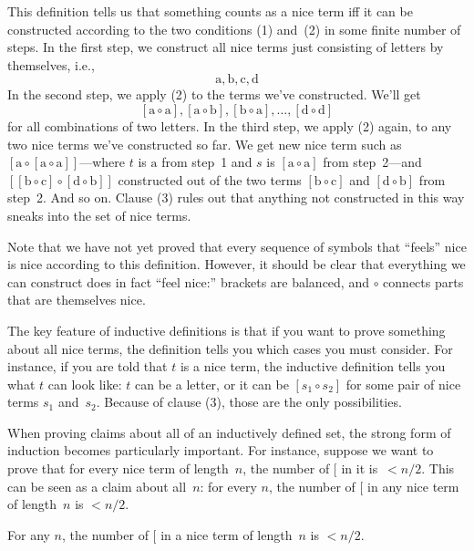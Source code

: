 \documentclass[../../../include/open-logic-section]{subfiles}
\begin{document}
This definition tells us that something counts as a nice term iff it
can be constructed according to the two conditions (1) and~(2) in some
finite number of steps. In the first step, we construct all nice terms
just consisting of letters by themselves, i.e.,
\[
\mathrm{a}, \mathrm{b}, \mathrm{c}, \mathrm{d}
\]
In the second step, we apply (2) to the terms we've constructed. We'll get
\[
[\mathrm{a} \circ \mathrm{a}], [\mathrm{a} \circ \mathrm{b}],
[\mathrm{b} \circ \mathrm{a}], \dots, [\mathrm{d} \circ \mathrm{d}]
\]
for all combinations of two letters. In the third step, we apply (2)
again, to any two nice terms we've constructed so far. We get new nice
term such as $[\mathrm{a} \circ [\mathrm{a} \circ
    \mathrm{a}]]$---where $t$ is $\mathrm{a}$ from step~1 and $s$ is
$[\mathrm{a} \circ \mathrm{a}]$ from step~2---and $[[\mathrm{b} \circ
    \mathrm{c}] \circ [\mathrm{d} \circ \mathrm{b}]]$ constructed out
of the two terms $[\mathrm{b} \circ \mathrm{c}]$ and $[\mathrm{d}
  \circ \mathrm{b}]$ from step~2. And so on.  Clause (3) rules out
that anything not constructed in this way sneaks into the set of nice
terms.

Note that we have not yet proved that every sequence of symbols that
``feels'' nice is nice according to this definition. However, it
should be clear that everything we can construct does in fact ``feel
nice:'' brackets are balanced, and $\circ$ connects parts that are
themselves nice.

The key feature of inductive definitions is that if you want to prove
something about all nice terms, the definition tells you which cases
you must consider.  For instance, if you are told that $t$ is a nice
term, the inductive definition tells you what $t$ can look like: $t$
can be a letter, or it can be $[s_1 \circ s_2]$ for some pair of
nice terms $s_1$ and~$s_2$. Because of clause (3), those are the only
possibilities.

When proving claims about all of an inductively defined set, the
strong form of induction becomes particularly important. For instance,
suppose we want to prove that for every nice term of length~$n$, the
number of $[$ in it is~$< n/2$.  This can be seen as a claim about
all~$n$: for every $n$, the number of $[$ in any nice term of
length~$n$ is $< n/2$.

\begin{prop}
  For any $n$, the number of $[$ in a nice term of length~$n$ is
  $< n/2$.
\end{prop}
\end{document}
